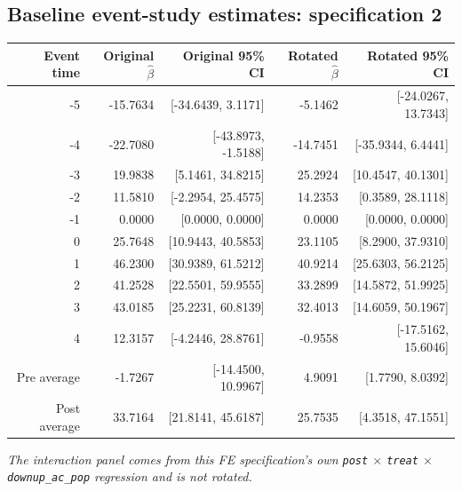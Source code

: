 \documentclass[10pt]{article}
\begin{document}
\subsection*{Baseline event-study estimates: specification 2}
\begin{center}
\scriptsize
\begin{tabular}{r rr rr}
\toprule
Event time & Original $\hat\beta$ & Original 95\% CI & Rotated $\hat\beta$ & Rotated 95\% CI \\
\midrule
-5 & -15.7634 & [-34.6439, 3.1171] & -5.1462 & [-24.0267, 13.7343] \\
-4 & -22.7080 & [-43.8973, -1.5188] & -14.7451 & [-35.9344, 6.4441] \\
-3 & 19.9838 & [5.1461, 34.8215] & 25.2924 & [10.4547, 40.1301] \\
-2 & 11.5810 & [-2.2954, 25.4575] & 14.2353 & [0.3589, 28.1118] \\
-1 & 0.0000 & [0.0000, 0.0000] & 0.0000 & [0.0000, 0.0000] \\
0 & 25.7648 & [10.9443, 40.5853] & 23.1105 & [8.2900, 37.9310] \\
1 & 46.2300 & [30.9389, 61.5212] & 40.9214 & [25.6303, 56.2125] \\
2 & 41.2528 & [22.5501, 59.9555] & 33.2899 & [14.5872, 51.9925] \\
3 & 43.0185 & [25.2231, 60.8139] & 32.4013 & [14.6059, 50.1967] \\
4 & 12.3157 & [-4.2446, 28.8761] & -0.9558 & [-17.5162, 15.6046] \\
\midrule
Pre average & -1.7267 & [-14.4500, 10.9967] & 4.9091 & [1.7790, 8.0392] \\
Post average & 33.7164 & [21.8141, 45.6187] & 25.7535 & [4.3518, 47.1551] \\
\bottomrule
\end{tabular}
\end{center}
\medskip
\textit{The interaction panel comes from this FE specification's own \texttt{post} $\times$ \texttt{treat} $\times$ \texttt{downup\_ac\_pop} regression and is not rotated.}
\clearpage
\end{document}
